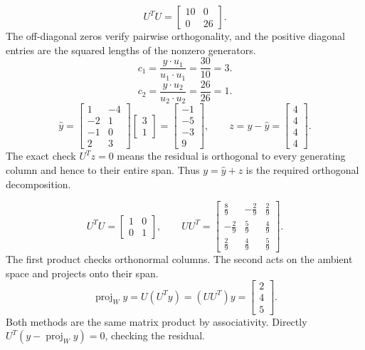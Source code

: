 \[U^TU=\left[\begin{array}{rr}10&0\\0&26\end{array}\right].\]
The off-diagonal zeros verify pairwise orthogonality, and the positive diagonal entries are the squared lengths of the nonzero generators.
\[c_{1}=\frac{y\cdot u_{1}}{u_{1}\cdot u_{1}}=\frac{30}{10}=3.\]
\[c_{2}=\frac{y\cdot u_{2}}{u_{2}\cdot u_{2}}=\frac{26}{26}=1.\]
\[\widehat y=\left[\begin{array}{rr}1&-4\\-2&1\\-1&0\\2&3\end{array}\right]\left[\begin{array}{r}3\\1\end{array}\right]=\left[\begin{array}{r}-1\\-5\\-3\\9\end{array}\right],\qquad z=y-\widehat y=\left[\begin{array}{r}4\\4\\4\\4\end{array}\right].\]
The exact check $U^Tz=0$ means the residual is orthogonal to every generating column and hence to their entire span. Thus $y=\widehat y+z$ is the required orthogonal decomposition.

\[U^TU=\left[\begin{array}{rr}1&0\\0&1\end{array}\right],\qquad UU^T=\left[\begin{array}{rrr}\frac{8}{9}&- \frac{2}{9}&\frac{2}{9}\\- \frac{2}{9}&\frac{5}{9}&\frac{4}{9}\\\frac{2}{9}&\frac{4}{9}&\frac{5}{9}\end{array}\right].\]
The first product checks orthonormal columns. The second acts on the ambient space and projects onto their span.
\[\operatorname{proj}_Wy=U(U^Ty)=(UU^T)y=\left[\begin{array}{r}2\\4\\5\end{array}\right].\]
Both methods are the same matrix product by associativity. Directly $U^T(y-\operatorname{proj}_Wy)=0$, checking the residual.

